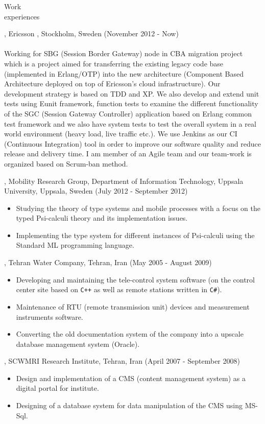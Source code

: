 \documentclass{resume}
\begin{document}
\begin{category}{Work \\experiences}

, Ericsson , Stockholm, Sweden (November 2012 - Now)\\ \\
Working for SBG (Session Border Gateway) node in CBA migration project which is a project 
aimed for transferring the existing legacy code base (implemented in Erlang/OTP) into the 
new architecture (Component Based Architecture deployed on top of Ericsson's cloud infrastructure). 
Our development strategy is based on TDD and XP. We also develop and extend unit tests using Eunit framework, 
function tests to examine the different functionality of the SGC (Session Gateway Controller) application 
based on Erlang common test framework and we also have system tests to test the overall system in a real 
world environment (heavy load, live traffic etc.). 
We use Jenkins as our CI (Continuous Integration) tool in order to improve our software 
quality and reduce release and delivery time. I am member of an Agile team and our team-work is 
organized based on Scrum-ban method.

, Mobility Research Group, Department of Information Technology, 
Uppsala University, Uppsala, Sweden (July 2012 - September 2012)\\ 
\begin{itemize}
 \item Studying the theory of type systems and mobile processes with a 
  focus on the typed Psi-calculi theory and its implementation issues.
 \item Implementing the type system for different instances of Psi-calculi 
  using the Standard ML programming language.
\end{itemize}

, Tehran Water Company, Tehran, Iran (May 2005 - August 2009)\\ 
\begin{itemize}
 \item Developing and maintaining the tele-control system software (on the control center site based 
  on \texttt{C++} as well as remote stations written in \texttt{C\#}).
 \item Maintenance of RTU (remote transmission unit) devices and measurement instruments software.
 \item Converting the old documentation system of the company into a upscale 
  database management system (Oracle).
\end{itemize}

, SCWMRI Research Institute, 
Tehran, Iran (April 2007 - September 2008)
\begin{itemize} 
\item Design and implementation of a CMS (content management system) as a 
 digital portal for institute.
\item Designing of a database system for data manipulation of the CMS using MS-Sql.
\end{itemize}

\end{category}
\end{document}
